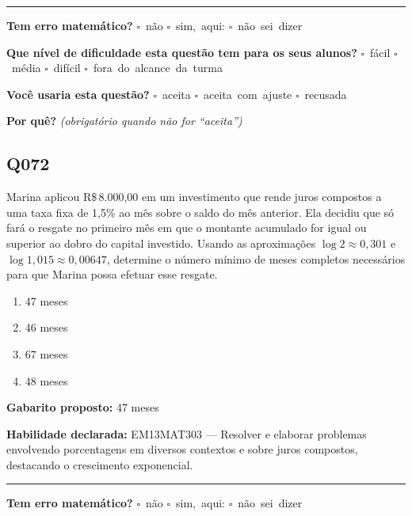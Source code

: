 \documentclass[11pt,a4paper]{article}
\begin{document}
\noindent\rule{\linewidth}{0.4pt}
\textbf{Tem erro matemático?}\quad
\mbox{$\square$~não} \quad \mbox{$\square$~sim, aqui:} \underline{\hspace{5cm}}
\quad \mbox{$\square$~não sei dizer}

\textbf{Que nível de dificuldade esta questão tem para os seus alunos?}\quad
\mbox{$\square$~fácil} \quad \mbox{$\square$~média} \quad
\mbox{$\square$~difícil} \quad \mbox{$\square$~fora do alcance da turma}

\textbf{Você usaria esta questão?}\quad
\mbox{$\square$~aceita} \quad \mbox{$\square$~aceita com ajuste} \quad
\mbox{$\square$~recusada}

\textbf{Por quê?} \emph{(obrigatório quando não for ``aceita'')}

\underline{\hspace{\linewidth}}

\underline{\hspace{\linewidth}}
\vspace{0.6em}

\begin{samepage}
\subsection*{Q072}
Marina aplicou R\$\,8.000,00 em um investimento que rende juros compostos a uma taxa fixa de 1,5\% ao mês sobre o saldo do mês anterior. Ela decidiu que só fará o resgate no primeiro mês em que o montante acumulado for igual ou superior ao dobro do capital investido. Usando as aproximações $\log 2 \approx 0,301$ e $\log 1,015 \approx 0,00647$, determine o número mínimo de meses completos necessários para que Marina possa efetuar esse resgate.
\begin{enumerate}[label=(\alph*),nosep,leftmargin=*]
\item 47 meses
\item 46 meses
\item 67 meses
\item 48 meses
\end{enumerate}

\textbf{Gabarito proposto:} 47 meses

\textbf{Habilidade declarada:} EM13MAT303 --- Resolver e elaborar problemas envolvendo porcentagens em diversos contextos e sobre juros compostos, destacando o crescimento exponencial.
\end{samepage}

\noindent\rule{\linewidth}{0.4pt}
\textbf{Tem erro matemático?}\quad
\mbox{$\square$~não} \quad \mbox{$\square$~sim, aqui:} \underline{\hspace{5cm}}
\quad \mbox{$\square$~não sei dizer}
\end{document}

